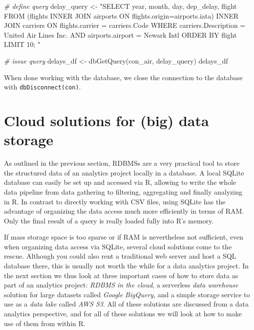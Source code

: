 \documentclass[
  12pt,
]{style/krantz}
\newenvironment{Shaded}{\begin{snugshade}}{\end{snugshade}}
\newcommand{\CommentTok}[1]{\textcolor[rgb]{0.56,0.35,0.01}{\textit{#1}}}
\newcommand{\FunctionTok}[1]{\textcolor[rgb]{0.00,0.00,0.00}{#1}}
\newcommand{\NormalTok}[1]{#1}
\newcommand{\OtherTok}[1]{\textcolor[rgb]{0.56,0.35,0.01}{#1}}
\newcommand{\StringTok}[1]{\textcolor[rgb]{0.31,0.60,0.02}{#1}}
\begin{document}
\begin{Shaded}
\begin{Highlighting}[]
\CommentTok{\# define query}
\NormalTok{delay\_query }\OtherTok{\textless{}{-}}
\StringTok{"SELECT }
\StringTok{year,}
\StringTok{month, }
\StringTok{day,}
\StringTok{dep\_delay,}
\StringTok{flight}
\StringTok{FROM (flights INNER JOIN airports ON flights.origin=airports.iata) }
\StringTok{INNER JOIN carriers ON flights.carrier = carriers.Code}
\StringTok{WHERE carriers.Description = \textquotesingle{}United Air Lines Inc.\textquotesingle{}}
\StringTok{AND airports.airport = \textquotesingle{}Newark Intl\textquotesingle{}}
\StringTok{ORDER BY flight}
\StringTok{LIMIT 10;}
\StringTok{"}

\CommentTok{\# issue query}
\NormalTok{delays\_df }\OtherTok{\textless{}{-}} \FunctionTok{dbGetQuery}\NormalTok{(con\_air, delay\_query)}
\NormalTok{delays\_df}
\end{Highlighting}
\end{Shaded}

When done working with the database, we close the connection to the database with \texttt{dbDisconnect(con)}.

\hypertarget{cloud-solutions-for-big-data-storage}{%
\section{Cloud solutions for (big) data storage}\label{cloud-solutions-for-big-data-storage}}

As outlined in the previous section, RDBMSs are a very practical tool to store the structured data of an analytics project locally in a database. A local SQLite database can easily be set up and accessed via R, allowing to write the whole data pipeline from data gathering to filtering, aggregating and finally analyzing in R. In contrast to directly working with CSV files, using SQLite has the advantage of organizing the data access much more efficiently in terms of RAM. Only the final result of a query is really loaded fully into R's memory.

If mass storage space is too sparse or if RAM is nevertheless not sufficient, even when organizing data access via SQLite, several cloud solutions come to the rescue. Although you could also rent a traditional web server and host a SQL database there, this is usually not worth the while for a data analytics project. In the next section we thus look at three important cases of how to store data as part of an analytics project: \emph{RDBMS in the cloud}, a serverless \emph{data warehouse} solution for large datasets called \emph{Google BigQuery}, and a simple storage service to use as a \emph{data lake} called \emph{AWS S3}. All of these solutions are discussed from a data analytics perspective, and for all of these solutions we will look at how to make use of them from within R.
\end{document}
